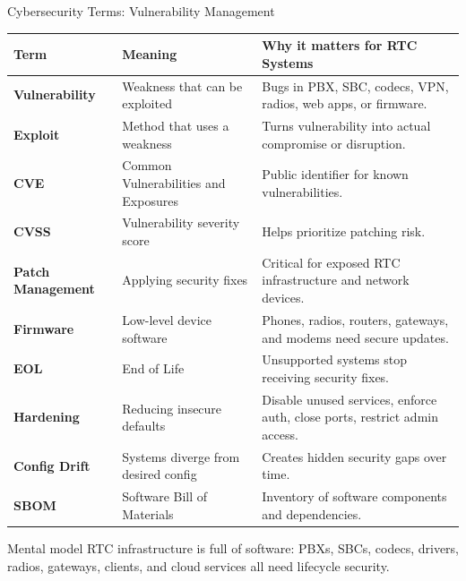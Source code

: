 \documentclass[aspectratio=169]{beamer}
\begin{document}
\begin{frame}{Cybersecurity Terms: Vulnerability Management}
\tiny
\begin{tabular}{p{2.2cm} p{3.5cm} p{6.5cm}}
\toprule
\textbf{Term} & \textbf{Meaning} & \textbf{Why it matters for RTC Systems} \\
\midrule
\textbf{Vulnerability} & Weakness that can be exploited & Bugs in PBX, SBC, codecs, VPN, radios, web apps, or firmware. \\
\textbf{Exploit} & Method that uses a weakness & Turns vulnerability into actual compromise or disruption. \\
\textbf{CVE} & Common Vulnerabilities and Exposures & Public identifier for known vulnerabilities. \\
\textbf{CVSS} & Vulnerability severity score & Helps prioritize patching risk. \\
\textbf{Patch Management} & Applying security fixes & Critical for exposed RTC infrastructure and network devices. \\
\textbf{Firmware} & Low-level device software & Phones, radios, routers, gateways, and modems need secure updates. \\
\textbf{EOL} & End of Life & Unsupported systems stop receiving security fixes. \\
\textbf{Hardening} & Reducing insecure defaults & Disable unused services, enforce auth, close ports, restrict admin access. \\
\textbf{Config Drift} & Systems diverge from desired config & Creates hidden security gaps over time. \\
\textbf{SBOM} & Software Bill of Materials & Inventory of software components and dependencies. \\
\bottomrule
\end{tabular}

\vspace{0.15cm}
\begin{block}{Mental model}
RTC infrastructure is full of software: PBXs, SBCs, codecs, drivers, radios, gateways, clients, and cloud services all need lifecycle security.
\end{block}
\end{frame}
\end{document}
